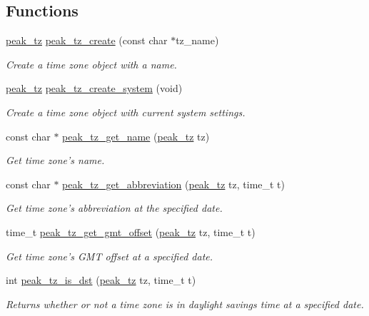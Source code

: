 \subsection*{Functions}
\begin{CompactItemize}
\item 
\hyperlink{group__tz_ga0}{peak\_\-tz} \hyperlink{group__tz_ga1}{peak\_\-tz\_\-create} (const char $\ast$tz\_\-name)
\begin{CompactList}\small\item\em Create a time zone object with a name. \item\end{CompactList}\item 
\hyperlink{group__tz_ga0}{peak\_\-tz} \hyperlink{group__tz_ga2}{peak\_\-tz\_\-create\_\-system} (void)
\begin{CompactList}\small\item\em Create a time zone object with current system settings. \item\end{CompactList}\item 
const char $\ast$ \hyperlink{group__tz_ga3}{peak\_\-tz\_\-get\_\-name} (\hyperlink{group__tz_ga0}{peak\_\-tz} tz)
\begin{CompactList}\small\item\em Get time zone's name. \item\end{CompactList}\item 
const char $\ast$ \hyperlink{group__tz_ga4}{peak\_\-tz\_\-get\_\-abbreviation} (\hyperlink{group__tz_ga0}{peak\_\-tz} tz, time\_\-t t)
\begin{CompactList}\small\item\em Get time zone's abbreviation at the specified date. \item\end{CompactList}\item 
time\_\-t \hyperlink{group__tz_ga5}{peak\_\-tz\_\-get\_\-gmt\_\-offset} (\hyperlink{group__tz_ga0}{peak\_\-tz} tz, time\_\-t t)
\begin{CompactList}\small\item\em Get time zone's GMT offset at a specified date. \item\end{CompactList}\item 
int \hyperlink{group__tz_ga6}{peak\_\-tz\_\-is\_\-dst} (\hyperlink{group__tz_ga0}{peak\_\-tz} tz, time\_\-t t)
\begin{CompactList}\small\item\em Returns whether or not a time zone is in daylight savings time at a specified date. \item\end{CompactList}\end{CompactItemize}


